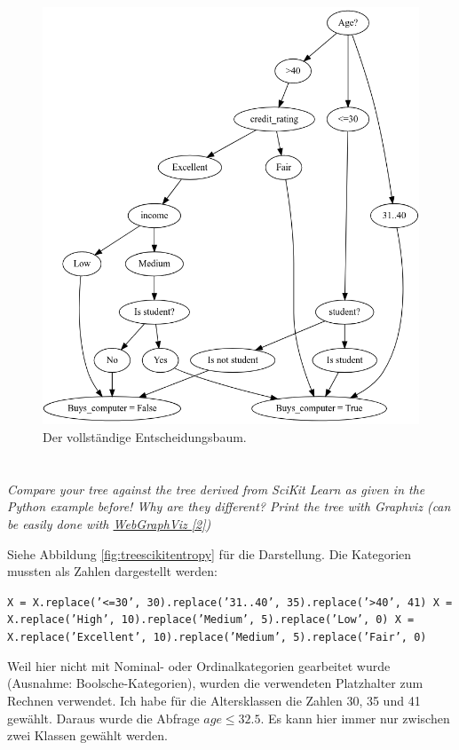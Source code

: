 \documentclass[11pt,a4paper]{article}
\begin{document}
\begin{figure}
	\centering
	\includegraphics[width=0.9\linewidth]{bilder/graph_complete}
	\caption{Der vollständige Entscheidungsbaum.}
	\label{fig:graphcomplete}
\end{figure}


\section{}

\textit{Compare your tree against the tree derived from SciKit Learn as given in the Python example before! Why are they different? Print the tree with Graphviz (can be easily done with \hyperref{http://www.webgraphviz.com/}{category}{name}{WebGraphViz [2]})}

Siehe Abbildung \ref{fig:treescikitentropy} für die Darstellung. Die Kategorien mussten als Zahlen dargestellt werden:

\texttt{X = X.replace('<=30', 30).replace('31..40', 35).replace('>40', 41)
X = X.replace('High', 10).replace('Medium', 5).replace('Low', 0)
X = X.replace('Excellent', 10).replace('Medium', 5).replace('Fair', 0)}

Weil hier nicht mit Nominal- oder Ordinalkategorien gearbeitet wurde (Ausnahme: Boolsche-Kategorien), wurden die verwendeten Platzhalter zum Rechnen verwendet. Ich habe für die Altersklassen die Zahlen 30, 35 und 41 gewählt. Daraus wurde die Abfrage $age \leq 32.5$. Es kann hier immer nur zwischen zwei Klassen gewählt werden.
\end{document}
